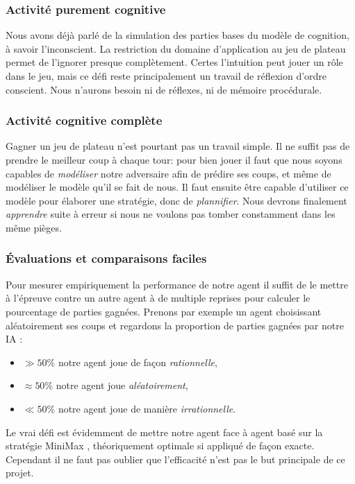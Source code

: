 \subsubsection{Activité purement cognitive}
Nous avons déjà parlé de la simulation des parties bases du modèle de cognition, à savoir l'inconscient. La restriction du domaine d'application au jeu de plateau permet de l'ignorer presque complètement. Certes l'intuition peut jouer un rôle dans le jeu, mais ce défi reste principalement un travail de réflexion d'ordre conscient. Nous n'aurons besoin ni de réflexes, ni de mémoire procédurale.

\subsubsection{Activité cognitive complète}
Gagner un jeu de plateau n'est pourtant pas un travail simple. Il ne suffit pas de prendre le \og meilleur \fg{} coup à chaque tour: pour bien jouer il faut que nous soyons capables de \emph{modéliser} notre adversaire afin de prédire ses coups, et même de modéliser le modèle qu'il se fait de nous. Il faut ensuite être capable d'utiliser ce modèle pour élaborer une stratégie, donc de \emph{plannifier}. Nous devrons finalement \emph{apprendre} suite à erreur si nous ne voulons pas tomber constamment dans les même pièges. 

\subsubsection{Évaluations et comparaisons faciles}
Pour mesurer empiriquement la performance de notre agent il suffit de le mettre à l'épreuve contre un autre agent à de multiple reprises pour calculer le pourcentage de parties gagnées. Prenons par exemple un agent choisissant aléatoirement ses coups et regardons la proportion de parties gagnées par notre IA :

\begin{itemize}
\item $\gg 50 \% $ notre agent joue de façon \emph{rationnelle}, 
\item $\approx 50 \% $ notre agent joue \emph{aléatoirement},
\item $\ll 50 \% $ notre agent joue de manière \emph{irrationnelle}.
\end{itemize}

Le vrai défi est évidemment de mettre notre agent face à agent basé sur la stratégie \og MiniMax \fg{}, théoriquement optimale si appliqué de façon exacte. Cependant il ne faut pas oublier que l'efficacité n'est pas le but principale de ce projet.

